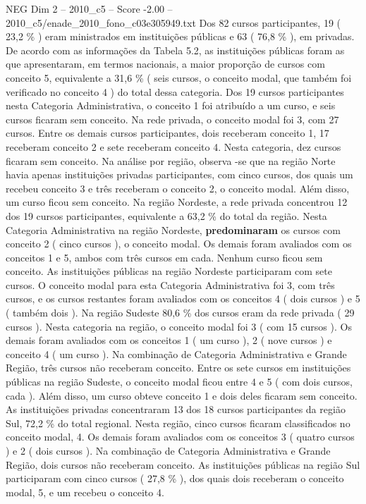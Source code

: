 \begin{textsample}{NEG Dim 2 – 2010\_c5 – Score -2.00 – 2010\_c5/enade\_2010\_fono\_c03e305949.txt}
Dos 82 cursos participantes, 19 ( 23,2 \% ) eram ministrados em instituições públicas e 63 ( 76,8 \% ), em privadas.
De acordo com as informações da Tabela 5.2, as instituições públicas foram as que apresentaram, em termos nacionais, a maior proporção de cursos com conceito 5, equivalente a 31,6 \% ( seis cursos, o conceito modal, que também foi verificado no conceito 4 ) do total dessa categoria.
Dos 19 cursos participantes nesta Categoria Administrativa, o conceito 1 foi atribuído a um curso, e seis cursos ficaram sem conceito.
Na rede privada, o conceito modal foi 3, com 27 cursos.
Entre os demais cursos participantes, dois receberam conceito 1, 17 receberam conceito 2 e sete receberam conceito 4.
Nesta categoria, dez cursos ficaram sem conceito.
Na análise por região, observa -se que na região Norte havia apenas instituições privadas participantes, com cinco cursos, dos quais um recebeu conceito 3 e três receberam o conceito 2, o conceito modal.
Além disso, um curso ficou sem conceito.
Na região Nordeste, a rede privada concentrou 12 dos 19 cursos participantes, equivalente a 63,2 \% do total da região.
Nesta Categoria Administrativa na região Nordeste, \textbf{predominaram} os cursos com conceito 2 ( cinco cursos ), o conceito modal.
Os demais foram avaliados com os conceitos 1 e 5, ambos com três cursos em cada.
Nenhum curso ficou sem conceito.
As instituições públicas na região Nordeste participaram com sete cursos.
O conceito modal para esta Categoria Administrativa foi 3, com três cursos, e os cursos restantes foram avaliados com os conceitos 4 ( dois cursos ) e 5 ( também dois ).
Na região Sudeste 80,6 \% dos cursos eram da rede privada ( 29 cursos ).
Nesta categoria na região, o conceito modal foi 3 ( com 15 cursos ).
Os demais foram avaliados com os conceitos 1 ( um curso ), 2 ( nove cursos ) e conceito 4 ( um curso ).
Na combinação de Categoria Administrativa e Grande Região, três cursos não receberam conceito.
Entre os sete cursos em instituições públicas na região Sudeste, o conceito modal ficou entre 4 e 5 ( com dois cursos, cada ).
Além disso, um curso obteve conceito 1 e dois deles ficaram sem conceito.
As instituições privadas concentraram 13 dos 18 cursos participantes da região Sul, 72,2 \% do total regional.
Nesta região, cinco cursos ficaram classificados no conceito modal, 4.
Os demais foram avaliados com os conceitos 3 ( quatro cursos ) e 2 ( dois cursos ).
Na combinação de Categoria Administrativa e Grande Região, dois cursos não receberam conceito.
As instituições públicas na região Sul participaram com cinco cursos ( 27,8 \% ), dos quais dois receberam o conceito modal, 5, e um recebeu o conceito 4.

\end{textsample}
